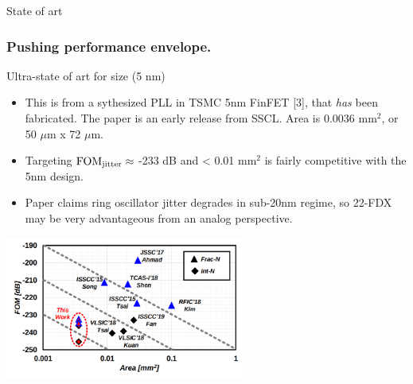 \documentclass[t, screen, aspectratio=43]{beamer}
\begin{document}
\begin{frame}
\begin{block}{State of art}
	\end{block}
\end{frame}

\begin{frame}
	\frametitle{Pushing performance envelope.}
	\begin{block}{Ultra-state of art for size (5 nm)}
		\scriptsize
		\begin{itemize}[itemsep=4pt,label=\protect---]
			\item This is from a sythesized PLL in TSMC 5nm FinFET [3], that \textit{has} been fabricated. The paper is an early release from SSCL. Area is 0.0036 mm$^2$, or 50 $\mu$m x 72 $\mu$m.
			\item Targeting $\textnormal{FOM}_{\textnormal{jitter}} \approx$ -233 dB and < 0.01 mm$^2$ is fairly competitive with the 5nm design.
			\item Paper claims ring oscillator jitter degrades in sub-20nm regime, so 22-FDX may be very advantageous from an analog perspective.
		\end{itemize} 	
		\vspace{-1em}
		\center\includegraphics[width=0.6\textwidth, angle=0]{5nm_pll_perf.png}
	\end{block}
\end{frame}
\end{document}
